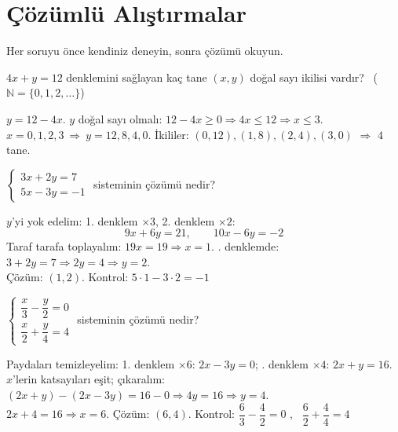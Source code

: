 \section{Çözümlü Alıştırmalar}
Her soruyu önce kendiniz deneyin, sonra çözümü okuyun.

\begin{alistirma}
\(4x+y=12\) denklemini sağlayan kaç tane \((x,y)\) doğal sayı ikilisi vardır? \ (\(\mathbb{N}=\{0,1,2,\dots\}\))
\end{alistirma}
\begin{cozum}
\(y=12-4x\). \(y\) doğal sayı olmalı: \(12-4x\ge 0\Rightarrow 4x\le 12\Rightarrow x\le 3\).\\
\(x=0,1,2,3\ \Rightarrow\ y=12,8,4,0\). \quad İkililer: \((0,12),(1,8),(2,4),(3,0)\) \(\Rightarrow\) \(4\) tane.
\end{cozum}

\begin{alistirma}
\(\begin{cases}3x+2y=7\\ 5x-3y=-1\end{cases}\) sisteminin çözümü nedir?
\end{alistirma}
\begin{cozum}
\(y\)'yi yok edelim: 1. denklem \(\times 3\), 2. denklem \(\times 2\):
\[9x+6y=21,\qquad 10x-6y=-2\]
Taraf tarafa toplayalım: \(19x=19\Rightarrow x=1\). . denklemde: \(3+2y=7\Rightarrow 2y=4\Rightarrow y=2\).\\
Çözüm: \((1,2)\). \quad Kontrol: \(5\cdot 1-3\cdot 2=-1\) \checkmark
\end{cozum}

\begin{alistirma}
\(\begin{cases}\dfrac{x}{3}-\dfrac{y}{2}=0\\[6pt] \dfrac{x}{2}+\dfrac{y}{4}=4\end{cases}\) sisteminin çözümü nedir?
\end{alistirma}
\begin{cozum}
Paydaları temizleyelim: 1. denklem \(\times 6\): \(2x-3y=0\); . denklem \(\times 4\): \(2x+y=16\).\\
\(x\)'lerin katsayıları eşit; çıkaralım: \((2x+y)-(2x-3y)=16-0\Rightarrow 4y=16\Rightarrow y=4\).\\
\(2x+4=16\Rightarrow x=6\). \quad Çözüm: \((6,4)\). \quad Kontrol: \(\dfrac63-\dfrac42=0\) \checkmark, \ \(\dfrac62+\dfrac44=4\) \checkmark
\end{cozum}

